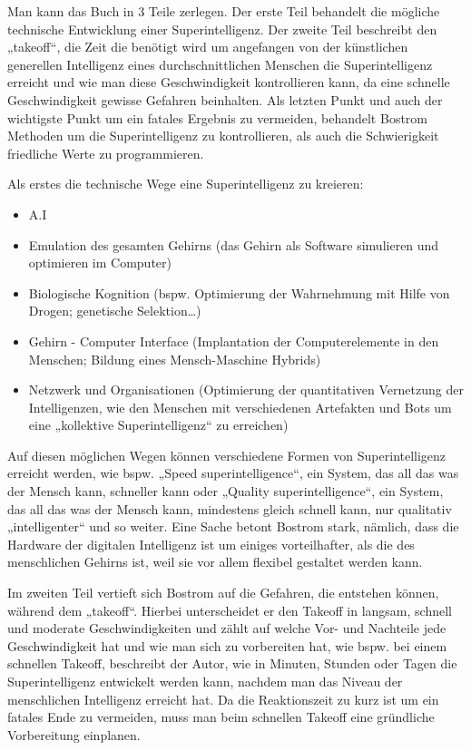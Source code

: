 \documentclass[twoside, a4paper, DIV=11, open=any, bibliography=totoc]{scrbook}
\begin{document}
Man kann das Buch in 3 Teile zerlegen. Der erste Teil behandelt die mögliche technische Entwicklung einer Superintelligenz. Der zweite Teil beschreibt den „takeoff“, die Zeit die benötigt wird um angefangen von der künstlichen generellen Intelligenz eines durchschnittlichen Menschen die Superintelligenz erreicht und wie man diese Geschwindigkeit kontrollieren kann, da eine schnelle Geschwindigkeit gewisse Gefahren beinhalten. Als letzten Punkt und auch der wichtigste Punkt um ein fatales Ergebnis zu vermeiden, behandelt Bostrom Methoden um die Superintelligenz zu kontrollieren, als auch die Schwierigkeit friedliche Werte zu programmieren.

Als erstes die technische Wege eine Superintelligenz zu kreieren: 

\begin{itemize}
    \item A.I
    \item  Emulation des gesamten Gehirns (das Gehirn als Software simulieren und optimieren im Computer)
    \item Biologische Kognition (bspw. Optimierung der Wahrnehmung mit Hilfe von Drogen; genetische Selektion…)
    \item Gehirn - Computer Interface (Implantation der Computerelemente in den Menschen; Bildung eines Mensch-Maschine Hybrids)
    \item Netzwerk und Organisationen (Optimierung der quantitativen Vernetzung der Intelligenzen, wie den Menschen mit verschiedenen Artefakten und Bots um eine „kollektive Superintelligenz“ zu erreichen)
\end{itemize}

Auf diesen möglichen Wegen können verschiedene Formen von Superintelligenz erreicht werden, wie bspw. „Speed superintelligence“, ein System, das all das was der Mensch kann, schneller kann oder „Quality superintelligence“, ein System, das all das was der Mensch kann, mindestens gleich schnell kann, nur qualitativ „intelligenter“ und so weiter. Eine Sache betont Bostrom stark, nämlich, dass die Hardware der digitalen Intelligenz ist um einiges vorteilhafter, als die des menschlichen Gehirns ist, weil sie vor allem flexibel gestaltet werden kann. 

Im zweiten Teil vertieft sich Bostrom auf die Gefahren, die entstehen können, während dem „takeoff“. Hierbei unterscheidet er den Takeoff in langsam, schnell und moderate Geschwindigkeiten und zählt auf welche Vor- und Nachteile jede Geschwindigkeit hat und wie man sich zu vorbereiten hat, wie bspw. bei einem schnellen Takeoff, beschreibt der Autor, wie in Minuten, Stunden oder Tagen die Superintelligenz entwickelt werden kann, nachdem man das Niveau der menschlichen Intelligenz erreicht hat. Da die Reaktionszeit zu kurz ist um ein fatales Ende zu vermeiden, muss man beim schnellen Takeoff eine gründliche Vorbereitung einplanen. 
\end{document}
